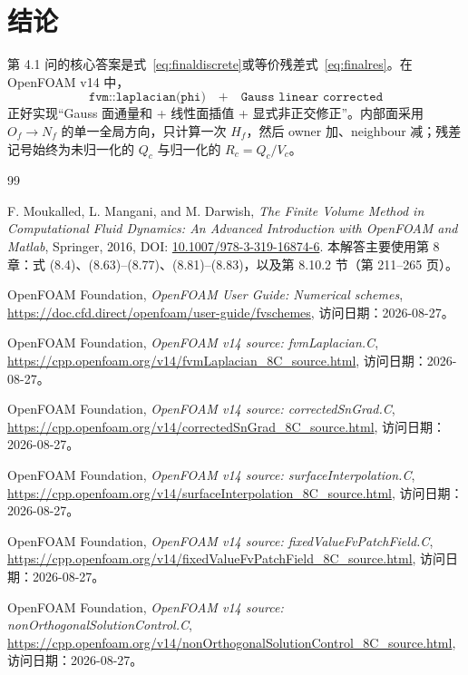 \documentclass[UTF8,a4paper,11pt]{ctexart}
\begin{document}
\section{结论}

第 4.1 问的核心答案是式~\eqref{eq:finaldiscrete}或等价残差式~\eqref{eq:finalres}。在 OpenFOAM v14 中，
\begin{equation*}
  \texttt{fvm::laplacian(phi)}
  \quad+\quad
  \texttt{Gauss linear corrected}
\end{equation*}
正好实现“Gauss 面通量和 + 线性面插值 + 显式非正交修正”。内部面采用 \(O_f\to N_f\) 的单一全局方向，只计算一次 \(H_f\)，然后 owner 加、neighbour 减；残差记号始终为未归一化的 \(Q_c\) 与归一化的 \(R_c=Q_c/V_c\)。

\begin{thebibliography}{99}

F. Moukalled, L. Mangani, and M. Darwish,
\textit{The Finite Volume Method in Computational Fluid Dynamics: An Advanced Introduction with OpenFOAM and Matlab},
Springer, 2016, DOI: \href{https://doi.org/10.1007/978-3-319-16874-6}{10.1007/978-3-319-16874-6}.
本解答主要使用第 8 章：式 (8.4)、(8.63)--(8.77)、(8.81)--(8.83)，以及第 8.10.2 节（第 211--265 页）。

OpenFOAM Foundation,
\textit{OpenFOAM User Guide: Numerical schemes},
\url{https://doc.cfd.direct/openfoam/user-guide/fvschemes},
访问日期：2026-08-27。

OpenFOAM Foundation,
\textit{OpenFOAM v14 source: fvmLaplacian.C},
\url{https://cpp.openfoam.org/v14/fvmLaplacian_8C_source.html},
访问日期：2026-08-27。

OpenFOAM Foundation,
\textit{OpenFOAM v14 source: correctedSnGrad.C},
\url{https://cpp.openfoam.org/v14/correctedSnGrad_8C_source.html},
访问日期：2026-08-27。

OpenFOAM Foundation,
\textit{OpenFOAM v14 source: surfaceInterpolation.C},
\url{https://cpp.openfoam.org/v14/surfaceInterpolation_8C_source.html},
访问日期：2026-08-27。

OpenFOAM Foundation,
\textit{OpenFOAM v14 source: fixedValueFvPatchField.C},
\url{https://cpp.openfoam.org/v14/fixedValueFvPatchField_8C_source.html},
访问日期：2026-08-27。

OpenFOAM Foundation,
\textit{OpenFOAM v14 source: nonOrthogonalSolutionControl.C},
\url{https://cpp.openfoam.org/v14/nonOrthogonalSolutionControl_8C_source.html},
访问日期：2026-08-27。

\end{thebibliography}
\end{document}
